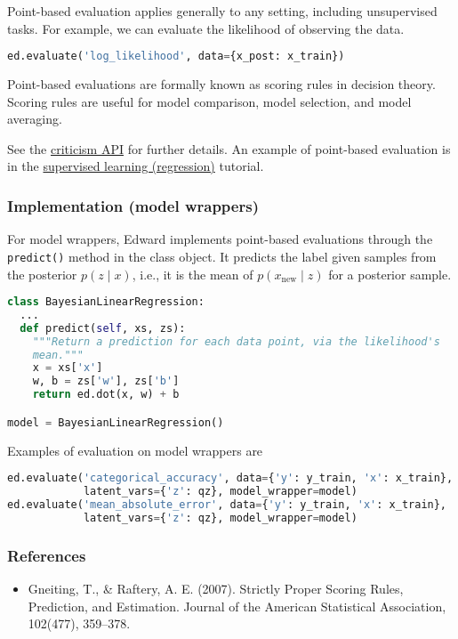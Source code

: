 Point-based evaluation applies generally to any setting, including
unsupervised tasks. For example, we can evaluate the likelihood of
observing the data.
\begin{lstlisting}[language=Python]
ed.evaluate('log_likelihood', data={x_post: x_train})
\end{lstlisting}

Point-based evaluations are formally known as scoring rules
in decision theory. Scoring rules are useful for model comparison, model
selection, and model averaging.

See the \href{api/criticisms}{criticism API} for further details.
An example of point-based evaluation is in the
\href{tut_supervised_regression}{supervised learning
(regression)} tutorial.

\subsubsection{Implementation (model wrappers)}

For model wrappers, Edward implements point-based evaluations through
the \texttt{predict()} method in the class object. It predicts
the label given samples from the posterior $p(z \mid x)$, i.e., it is
the mean of $p(x_\text{new} \mid z)$ for a posterior sample.
\begin{lstlisting}[language=Python]
class BayesianLinearRegression:
  ...
  def predict(self, xs, zs):
    """Return a prediction for each data point, via the likelihood's
    mean."""
    x = xs['x']
    w, b = zs['w'], zs['b']
    return ed.dot(x, w) + b

model = BayesianLinearRegression()
\end{lstlisting}
Examples of evaluation on model wrappers are
\begin{lstlisting}[language=Python]
ed.evaluate('categorical_accuracy', data={'y': y_train, 'x': x_train},
            latent_vars={'z': qz}, model_wrapper=model)
ed.evaluate('mean_absolute_error', data={'y': y_train, 'x': x_train},
            latent_vars={'z': qz}, model_wrapper=model)
\end{lstlisting}

\subsubsection{References}\label{references}

\begin{itemize}
\item
  Gneiting, T., & Raftery, A. E. (2007). Strictly Proper Scoring
  Rules, Prediction, and Estimation. Journal of the American
  Statistical Association, 102(477), 359–378.
\end{itemize}

